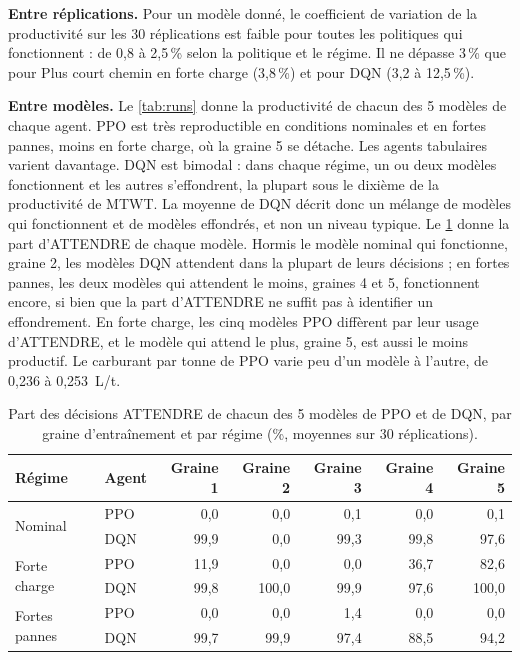 \documentclass[11pt,a4paper]{article}
\newif\ifrevmarks
\newcommand{\revtag}[1]{\ifrevmarks\textsuperscript{\textcolor{red!70!black}{\scriptsize[#1]}}\fi}
\newenvironment{revbloc}[1]{\par\ifrevmarks\color{revcolor}\noindent\revtag{#1}\ \fi}{\par}
\newif\ifcorrmarks
\newcommand{\corr}[1]{\ifcorrmarks\textcolor{corrcolor}{#1}\else#1\fi}
\newenvironment{corrbloc}{\par\ifcorrmarks\color{corrcolor}\fi}{\par}
\begin{document}
\begin{revbloc}{T31}
\textbf{Entre réplications.} Pour un modèle donné, le coefficient de variation de la productivité sur les 30 réplications est faible pour toutes les politiques qui fonctionnent : de 0,8 à 2,5\,\% selon la politique et le régime. Il ne dépasse 3\,\% que pour Plus court chemin en forte charge (3,8\,\%) et pour DQN (3,2 à 12,5\,\%).

\textbf{Entre modèles.} Le \cref{tab:runs} donne la productivité de chacun des 5 modèles de chaque agent. PPO est très reproductible \corr{en conditions nominales et en fortes pannes, moins en forte charge, où la graine 5 se détache}. Les agents tabulaires varient davantage. DQN est bimodal : dans chaque régime, \corr{un ou deux modèles fonctionnent et les autres s'effondrent, la plupart sous le dixième de la productivité de MTWT}. La moyenne de DQN décrit donc un mélange de modèles qui fonctionnent et de modèles effondrés, et non un niveau typique. \corr{Le \cref{tab:runs_wait} donne la part d'ATTENDRE de chaque modèle. Hormis le modèle nominal qui fonctionne, graine 2, les modèles DQN attendent dans la plupart de leurs décisions ; en fortes pannes, les deux modèles qui attendent le moins, graines 4 et 5, fonctionnent encore, si bien que la part d'ATTENDRE ne suffit pas à identifier un effondrement. En forte charge, les cinq modèles PPO diffèrent par leur usage d'ATTENDRE, et le modèle qui attend le plus, graine 5, est aussi le moins productif. Le carburant par tonne de PPO varie peu d'un modèle à l'autre, de 0,236 à 0,253~L/t.}

\begin{corrbloc}
\begin{table}[H]
\centering
\caption{Part des décisions ATTENDRE de chacun des 5 modèles de PPO et de DQN, par graine d'entraînement et par régime (\%, moyennes sur 30 réplications).}
\label{tab:runs_wait}
\small
\setlength{\tabcolsep}{4pt}
\begin{tabular}{@{}llrrrrr@{}}
\toprule
\textbf{Régime} & \textbf{Agent} & \textbf{Graine 1} & \textbf{Graine 2} & \textbf{Graine 3} & \textbf{Graine 4} & \textbf{Graine 5} \\
\midrule
\multirow{2}{*}{Nominal} & PPO & 0{,}0 & 0{,}0 & 0{,}1 & 0{,}0 & 0{,}1 \\
 & DQN & 99{,}9 & 0{,}0 & 99{,}3 & 99{,}8 & 97{,}6 \\
\midrule
\multirow{2}{*}{Forte charge} & PPO & 11{,}9 & 0{,}0 & 0{,}0 & 36{,}7 & 82{,}6 \\
 & DQN & 99{,}8 & 100{,}0 & 99{,}9 & 97{,}6 & 100{,}0 \\
\midrule
\multirow{2}{*}{Fortes pannes} & PPO & 0{,}0 & 0{,}0 & 1{,}4 & 0{,}0 & 0{,}0 \\
 & DQN & 99{,}7 & 99{,}9 & 97{,}4 & 88{,}5 & 94{,}2 \\
\bottomrule
\end{tabular}
\end{table}
\end{corrbloc}


\end{revbloc}
\end{document}
